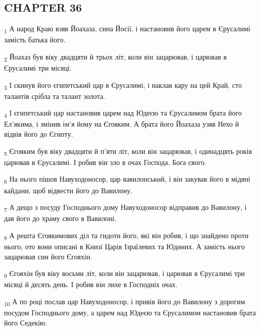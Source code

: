 \subsection{CHAPTER 36}
\begin{tcolorbox}
\textsubscript{1} А народ Краю взяв Йоахаза, сина Йосії, і настановив його царем в Єрусалимі замість батька його.
\end{tcolorbox}
\begin{tcolorbox}
\textsubscript{2} Йоахаз був віку двадцяти й трьох літ, коли він зацарював, і царював в Єрусалимі три місяці.
\end{tcolorbox}
\begin{tcolorbox}
\textsubscript{3} І скинув його єгипетський цар в Єрусалимі, і наклав кару на цей Край, сто талантів срібла та талант золота.
\end{tcolorbox}
\begin{tcolorbox}
\textsubscript{4} І єгипетський цар настановив царем над Юдеєю та Єрусалимом брата його Ел'якима, і змінив ім'я йому на Єгояким. А брата його Йоахаза узяв Нехо й відвів його до Єгипту.
\end{tcolorbox}
\begin{tcolorbox}
\textsubscript{5} Єгояким був віку двадцяти й п'яти літ, коли він зацарював, і одинадцять років царював в Єрусалимі. І робив він зло в очах Господа, Бога свого.
\end{tcolorbox}
\begin{tcolorbox}
\textsubscript{6} На нього пішов Навуходоносор, цар вавилонський, і він закував його в мідяні кайдани, щоб відвести його до Вавилону.
\end{tcolorbox}
\begin{tcolorbox}
\textsubscript{7} А дещо з посуду Господнього дому Навуходоносор відправив до Вавилону, і дав його до храму свого в Вавилоні.
\end{tcolorbox}
\begin{tcolorbox}
\textsubscript{8} А решта Єгоякимових діл та гидоти його, які він робив, і що знайдено проти нього, ото вони описані в Книзі Царів Ізраїлевих та Юдиних. А замість нього зацарював син його Єгояхін.
\end{tcolorbox}
\begin{tcolorbox}
\textsubscript{9} Єгояхін був віку восьми літ, коли він зацарював, і царював в Єрусалимі три місяці й десять день. І робив він лихе в Господніх очах.
\end{tcolorbox}
\begin{tcolorbox}
\textsubscript{10} А по році послав цар Навуходоносор, і привів його до Вавилону з дорогим посудом Господнього дому, а царем над Юдеєю та Єрусалимом настановив брата його Седекію.
\end{tcolorbox}
